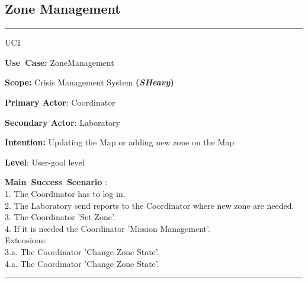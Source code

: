 \subsection{Zone Management}
\vspace{0.5cm}
\hrule
\vspace{0.5cm}
\begin{lyxlist}{UC1}
\small{
\item [\textbf{Use~Case:}] ZoneManagement
\item [\textbf{Scope:}] Crisis Management System \textbf{(\emph{SHeavy})}
\item [\textbf{Primary Actor}:] Coordinator
\item [\textbf{Secondary Actor}:] Laboratory
\item [\textbf{Intention:}] Updating the Map or adding new zone on the Map
\item [\textbf{Level}:] User-goal level
\item [\textbf{Main~Success~Scenario}]:\\
1. The Coordinator has to log in.\\
2. The Laboratory send reports to the Coordinator where new zone are needed.\\
3. The Coordinator 'Set Zone'.\\
4. If it is needed the Coordinator 'Mission Management'.\\
Extensions:\\
	3.a. The Coordinator 'Change Zone State'.\\
	4.a. The Coordinator 'Change Zone State'.\\
}
\end{lyxlist}
\hrule
\vspace{0.5cm} 

